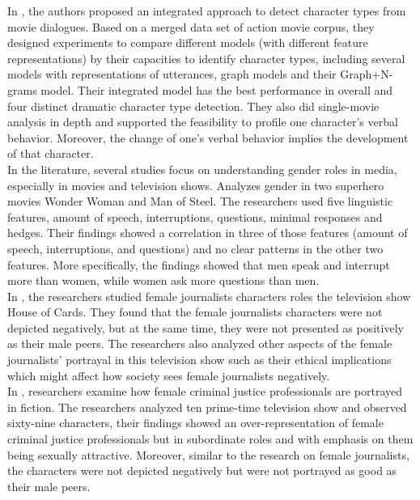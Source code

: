 \documentclass[11pt,a4paper]{article}
\begin{document}
In \cite{Skowron2016AutomaticDialogs}, the authors proposed an integrated approach to detect character types from movie dialogues. Based on a merged data set of action movie corpus, they designed experiments to compare different models (with different feature representations) by their capacities to identify character types, including several models with representations of utterances, graph models and their  Graph+N-grams model. Their integrated model has the best performance in overall and four distinct dramatic character type detection.
They also did single-movie analysis in depth and supported the feasibility to profile one character’s verbal behavior. Moreover, the change of one’s verbal behavior implies the development of that character.\\

In the literature, several studies focus on understanding gender roles in media, especially in movies and television shows. \cite{Movies2018The:} Analyzes gender in two superhero movies Wonder Woman and Man of Steel. The researchers used five linguistic features, amount of speech, interruptions, questions, minimal responses and hedges. Their findings showed a correlation in three of those features (amount of speech, interruptions, and questions) and no clear patterns in the other two features. More specifically, the findings showed that men speak and interrupt more than women, while women ask more questions than men. \\

In \cite{Painter2017GenderCards}, the researchers studied female journalists characters roles the television show House of Cards. They found that the female journalists characters were not depicted negatively, but at the same time, they were not presented as positively as their male peers. The researchers also analyzed other aspects of the female journalists' portrayal in this television show such as their ethical implications which might affect how society sees female journalists negatively. \\

In \cite{DeTardo-Bora2009CriminalDramas}, researchers examine how female criminal justice professionals are portrayed in fiction. The researchers analyzed ten prime-time television show and observed sixty-nine characters, their findings showed an over-representation of female criminal justice professionals but in subordinate roles and with emphasis on them being sexually attractive. Moreover, similar to the research on female journalists, the characters were not depicted negatively but were not portrayed as good as their male peers. \\
\end{document}
